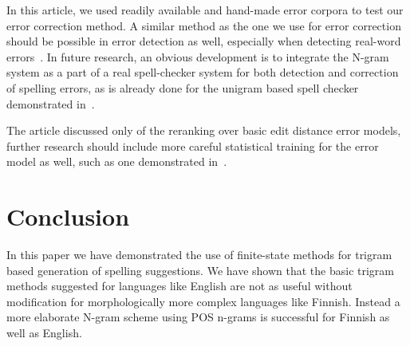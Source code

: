 \documentclass{llncs}
\begin{document}
In this article, we used readily available and hand-made error corpora to test
our error correction method. A similar method as the one we use for error
correction should be possible in error detection as well, especially when
detecting real-word errors~\cite{mays/1991}. In future research, an obvious
development is to integrate the N-gram system as a part of a real spell-checker
system for both detection and correction of spelling errors, as is already done
for the unigram based spell checker demonstrated in~\cite{pirinen/2010/lrec}.

The article discussed only of the reranking over basic edit distance error
models, further research should include more careful statistical training for
the error model as well, such as one demonstrated in~\cite{brill/2000}. 

\section{Conclusion}

In this paper we have demonstrated the use of finite-state methods for trigram
based generation of spelling suggestions. We have shown that the basic trigram
methods suggested for languages like English are not as useful without
modification for morphologically more complex languages like Finnish.  Instead
a more elaborate N-gram scheme using  POS n-grams is successful for Finnish as
well as English.





\end{document}
